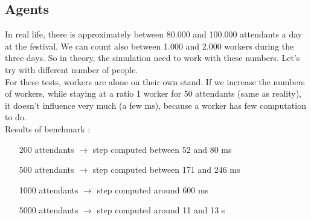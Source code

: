 \subsection{Agents}

In real life, there is approximately between 80.000 and 100.000 attendants a day at the festival. We can count also between 1.000 and 2.000 workers during the three days. So in theory, the simulation need to work with these numbers. Let’s try with different number of people.\\
 
For these tests, workers are alone on their own stand. If we increase the numbers of workers, while staying at a ratio 1 worker for 50 attendants (same as reality), it doesn’t influence very much (a few ms), because a worker has few computation to do.\\

Results of benchmark :\\

\begin{itemize}
	\item[200 attendants] $\rightarrow$ step computed between 52 and 80 ms
	\item[500 attendants] $\rightarrow$ step computed between 171 and 246 ms
	\item[1000 attendants] $\rightarrow$ step computed around 600 ms
	\item[5000 attendants] $\rightarrow$ step computed around 11 and 13 s
\end{itemize}